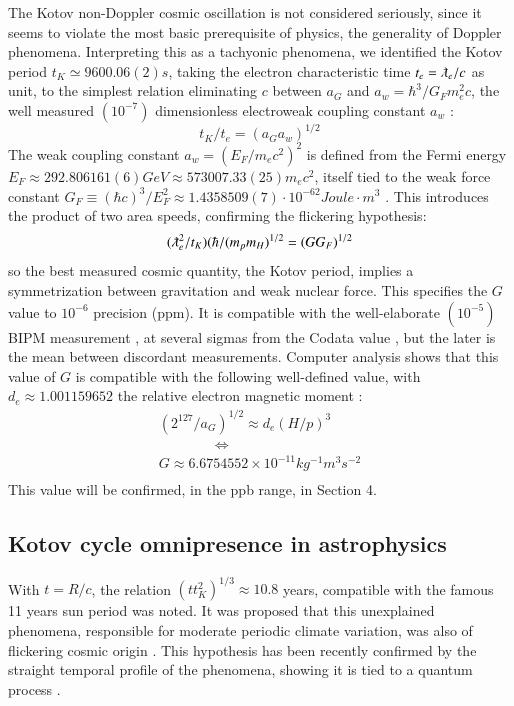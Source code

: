 \documentclass[twoside,draft]{article}
\begin{document}
\begin{sloppypar}
The Kotov non-Doppler cosmic oscillation \cite{Sanchez1} is not considered seriously, since it seems to
violate the most basic prerequisite of physics, the generality of Doppler phenomena. Interpreting
this as a tachyonic phenomena, we identified the Kotov period $t_{K} \simeq 9600.06(2) s$, taking the electron
characteristic time $t_{e} = \lambdabar_{e} /c$ as unit, to the simplest relation eliminating $c$ between $a_{G}$ and $a_{w}=
\hbar^{3} /G_{F} m_{e}^{2} c$, the well measured $(10^{-7})$ dimensionless electroweak coupling constant $a_{w}$ :
\begin{equation}
t_{K} / t_{e} = (a_{G} a_{w})^{1/2}
\end{equation}
The weak coupling constant \cite{Carr} $a_{w} = (E_{F} /m_{e} c^{2} )^{2}$ is defined from the Fermi energy 
$
E_{F} \approx 292.806161(6) GeV \approx 573007.33(25) m_{e} c^{2}
$, itself tied to the weak force constant 
$
G_{F} \equiv (\hbar c)^{3} /E_{F}^{2} \approx
1.4358509(7) \cdot 10^{-62} Joule \cdot m^{3}
$
. This introduces the product of two area speeds, confirming the
flickering hypothesis:
\begin{equation}
(\lambdabar_{e}^2/t_{K} )(\hbar/(m_{p} m_{H})^{1/2} = (GG_{F})^{1/2}
\end{equation}
so the best measured cosmic quantity, the Kotov period, implies a symmetrization between
gravitation and weak nuclear force. This specifies the $G$ value to $10^{-6}$ precision (ppm). It is
compatible with the well-elaborate $(10^{-5})$ BIPM measurement \cite{Quinn}, at several sigmas from the Codata
value \cite{Tanabashi}, but the later is the mean between discordant measurements.
Computer analysis shows that this value of $G$ is compatible with the following well-defined value, with $d_{e} \approx 1.001159652$ the relative electron magnetic moment :
$$\begin{array}{ll}
(2^{127} /a_{G} )^{1/2} \approx d_{e} (H/p)^{3} \\
\qquad  \qquad \Leftrightarrow \\
G \approx 6.6754552 \times 10^{-11} kg^{-1} m^{3} s^{-2} \\
\end{array}$$
This value will be confirmed, in the ppb range, in Section 4.

\subsection{Kotov cycle omnipresence in astrophysics}

With $t = R/c$, the relation $(t t_{K}^2)^{1/3} \approx 10.8$ years, compatible with the famous 11 years sun period
was noted. It was proposed that this unexplained phenomena, responsible for moderate periodic
climate variation, was also of flickering cosmic origin \cite{Sanchez3}. This hypothesis has been recently
confirmed by the straight temporal profile of the phenomena, showing it is tied to a quantum
process \cite{Kotov2}.


\end{sloppypar}
\end{document}
